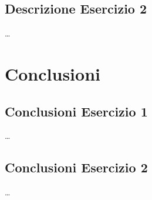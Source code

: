 \documentclass[a4paper]{article}
\begin{document}
\subsection{Descrizione Esercizio 2}
\dots

\section{Conclusioni}
\subsection{Conclusioni Esercizio 1}
\dots
\subsection{Conclusioni Esercizio 2}
\dots
\end{document}
